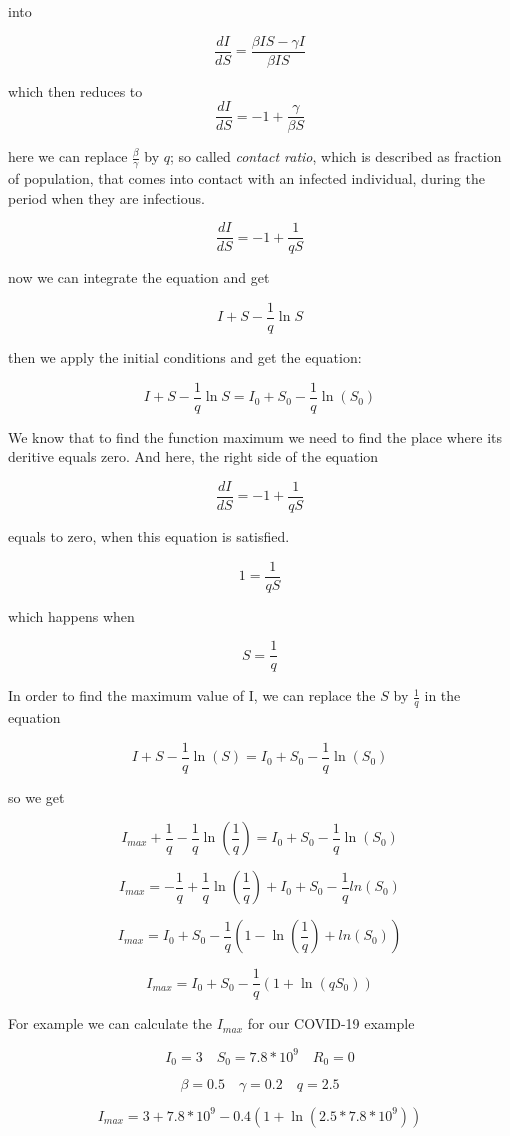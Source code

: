 \documentclass[nostrict]{szablonPG}
\begin{document}
into 

\[\frac{dI}{dS} = \frac{\beta I S - \gamma I}{\beta I S}\]

which then reduces to 
\[\frac{dI}{dS} = -1 + \frac{\gamma}{\beta S}\]

here we can replace $\frac{\beta}{\gamma}$ by $q$; so called \textit{contact ratio}, which is described as fraction of population, that comes into contact with an infected individual, during the period when they are infectious.

\[\frac{dI}{dS} = -1 + \frac{1}{q S}\]

now we can integrate the equation and get

\[I + S - \frac{1}{q} \ln{S}\]

then we apply the initial conditions and get the equation:

\[I + S - \frac{1}{q} \ln{S} = I_0 + S_0 - \frac{1}{q} \ln(S_0)\]

We know that to find the function maximum we need to find the place where its deritive equals zero. And here, the right side of the equation 

\[\frac{dI}{dS} = -1 + \frac{1}{q S}\]

equals to zero, when this equation is satisfied.

\[1 = \frac{1}{q S}\]

which happens when 

\[S = \frac{1}{q}\]

In order to find the maximum value of I, we can replace the $S$ by $\frac{1}{q}$ in the equation

\[I + S - \frac{1}{q} \ln(S) = I_0 + S_0 - \frac{1}{q} \ln(S_0)\]

so we get

\[I_{max} + \frac{1}{q} - \frac{1}{q} \ln(\frac{1}{q}) = I_0 + S_0 - \frac{1}{q} \ln(S_0)\]

\[I_{max} = - \frac{1}{q} + \frac{1}{q}\ln(\frac{1}{q}) + I_0 + S_0 -\frac{1}{q}ln(S_0)\]

\[I_{max} = I_0 + S_0 - \frac{1}{q} ( 1 - \ln(\frac{1}{q}) + ln(S_0))\]

\[I_{max} = I_0 + S_0 - \frac{1}{q} ( 1 + \ln(q S_0))\]

For example we can calculate the $I_{max}$ for our COVID-19 example 

\[I_0 = 3 \quad S_0 = 7.8 * 10^9 \quad R_0 = 0\]

\[\beta = 0.5 \quad \gamma = 0.2 \quad q = 2.5\]

\[I_{max} = 3 + 7.8 * 10^9 - 0.4 ( 1 + \ln(2.5 * 7.8 * 10^9))\]
\end{document}
